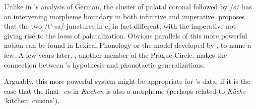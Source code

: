 Unlike in \citeauthor{Bloomfield1930}'s analysis of German, the cluster of palatal coronal followed by /s/ has an intervening morpheme boundary in both infinitive and imperative. \citeauthor{Jakobson1932} proposes that the two /t'-sa/ junctures in c, in fact different, with the imperative not giving rise to the loess of palatalization. Obvious parallels of this more powerful notion can be found in Lexical Phonology or the model developed by \citet{Halle1987}, to name a few. A few years later, \citet{Trnka1936}, another member of the Prague Circle, makes the connection between \citeauthor{Jakobson1932}'s hypothesis and phonotactic generalizations.

Arguably, this more powerful system might be appropriate for \citeauthor{Bloomfield1930}'s data, if it is the case that the final \emph{-en} in \emph{Kuchen} is also a morpheme (perhaps related to \emph{K\"uche} `kitchen; cuisine').


